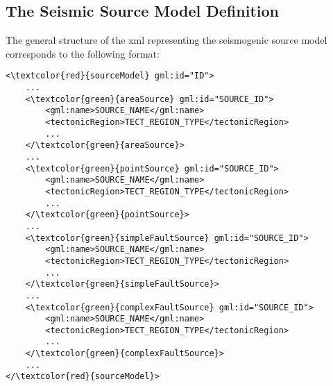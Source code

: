 \subsection{The Seismic Source Model Definition}
The general structure of the xml representing the seismogenic source model 
corresponds to the following format:
\begin{Verbatim}[frame=single, commandchars=\\\{\}, fontsize=\small]
<\textcolor{red}{sourceModel} gml:id="ID">
	...
	<\textcolor{green}{areaSource} gml:id="SOURCE_ID">
		<gml:name>SOURCE_NAME</gml:name>
		<tectonicRegion>TECT_REGION_TYPE</tectonicRegion>
		...
	</\textcolor{green}{areaSource}>
	...
	<\textcolor{green}{pointSource} gml:id="SOURCE_ID">
		<gml:name>SOURCE_NAME</gml:name>
		<tectonicRegion>TECT_REGION_TYPE</tectonicRegion>
		...
	</\textcolor{green}{pointSource}>
	...
	<\textcolor{green}{simpleFaultSource} gml:id="SOURCE_ID">
		<gml:name>SOURCE_NAME</gml:name>
		<tectonicRegion>TECT_REGION_TYPE</tectonicRegion>
		...
	</\textcolor{green}{simpleFaultSource}>
	...
	<\textcolor{green}{complexFaultSource} gml:id="SOURCE_ID">
		<gml:name>SOURCE_NAME</gml:name>
		<tectonicRegion>TECT_REGION_TYPE</tectonicRegion>
		...
	</\textcolor{green}{complexFaultSource}>
	...
</\textcolor{red}{sourceModel}>
\end{Verbatim}
